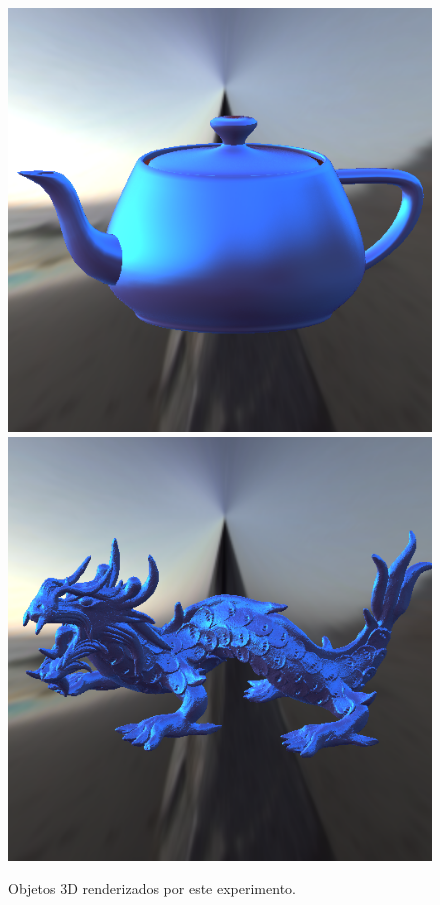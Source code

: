 \begin{figure}[H]
    \caption{\small{Objetos 3D renderizados por este experimento.}}
    \label{fig-cook-torrance-eqlang}
  \includegraphics[width=\linewidth]{./Imagens/brdfs/cook-torrance-teapot.png}
\endminipage\hfill
{}
  \includegraphics[width=\linewidth]{./Imagens/brdfs/cook-torrance-dragon.png}

\end{figure}
